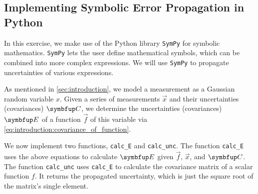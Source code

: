 \subsection{Implementing Symbolic Error Propagation in Python}
\label{sec:analysis:error_propagation}
In this exercise, we make use of the Python library \verb|SymPy| for symbolic mathematics.
\verb|SymPy| lets the user define mathematical symbols, which can be combined into more complex expressions.
We will use \verb|SymPy| to propagate uncertainties of various expressions.

As mentioned in \autoref{sec:introduction}, we model a measurement as a Gaussian random variable \( x \).
Given a series of measurements \( \vec{x} \) and their uncertainties (covariances) \( \mat{C} \), we determine the uncertainties (covariances) \( \mat{E} \) of a function \( \vec{f} \) of this variable via \autoref{eq:introduction:covariance_of_function}.

We now implement two functions, \verb|calc_E| and \verb|calc_unc|.
The function \verb|calc_E| uses the above equations to calculate \( \mat{E} \) given \( \vec f \), \( \vec x \), and \( \mat{C} \).
The function \verb|calc_unc| uses \verb|calc_E| to calculate the covariance matrix of a scalar function \( f \).
It returns the propagated uncertainty, which is just the square root of the matrix's single element.

